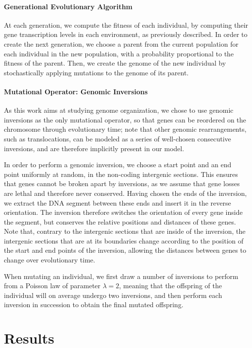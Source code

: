 \paragraph{Generational Evolutionary Algorithm}
At each generation, we compute the fitness of each individual, by computing their gene transcription levels in each environment, as previously described.
In order to create the next generation, we choose a parent from the current population for each individual in the new population, with a probability proportional to the fitness of the parent.
Then, we create the genome of the new individual by stochastically applying mutations to the genome of its parent.

\paragraph{Mutational Operator: Genomic Inversions}
As this work aims at studying genome organization, we chose to use genomic inversions as the only mutational operator, so that genes can be reordered on the chromosome through evolutionary time; note that other genomic rearrangements, such as translocations, can be modeled as a series of well-chosen consecutive inversions, and are therefore implicitly present in our model.

In order to perform a genomic inversion, we choose a start point and an end point uniformly at random, in the non-coding intergenic sections.
This ensures that genes cannot be broken apart by inversions, as we assume that gene losses are lethal and therefore never conserved.
Having chosen the ends of the inversion, we extract the DNA segment between these ends and insert it in the reverse orientation.
The inversion therefore switches the orientation of every gene inside the segment, but conserves the relative positions and distances of these genes.
Note that, contrary to the intergenic sections that are inside of the inversion, the intergenic sections that are at its boundaries change according to the position of the start and end points of the inversion, allowing the distances between genes to change over evolutionary time.

When mutating an individual, we first draw a number of inversions to perform from a Poisson law of parameter $\lambda = 2$, meaning that the offspring of the individual will on average undergo two inversions, and then perform each inversion in succession to obtain the final mutated offspring.


\section{Results}

